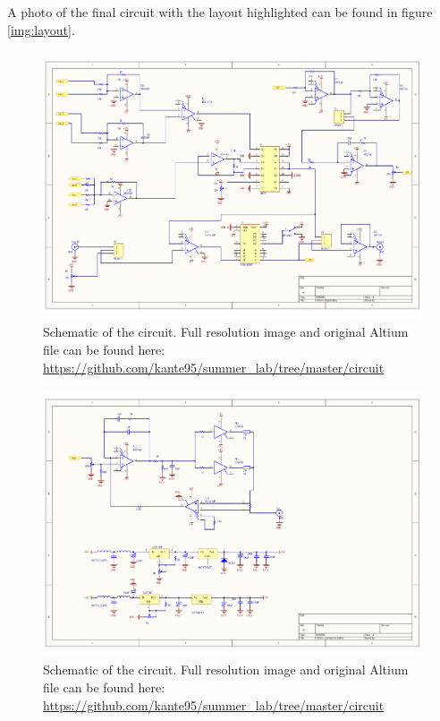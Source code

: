 \documentclass[a4paper,10pt]{article}
\begin{document}
A photo of the final circuit with the layout highlighted can be found in figure \ref{img:layout}.
\begin{figure}
\centering
\includegraphics[width = \textwidth]{circuit/pid}
\caption{Schematic of the circuit. Full resolution image and original Altium file can be found here: \url{https://github.com/kante95/summer_lab/tree/master/circuit}} \label{img:circuipid}
\end{figure}
\begin{figure}
\centering
\includegraphics[width = \textwidth]{circuit/currentdriver}
\caption{Schematic of the circuit. Full resolution image and original Altium file can be found here: \url{https://github.com/kante95/summer_lab/tree/master/circuit}} \label{img:currentdriver}
\end{figure}
\end{document}
